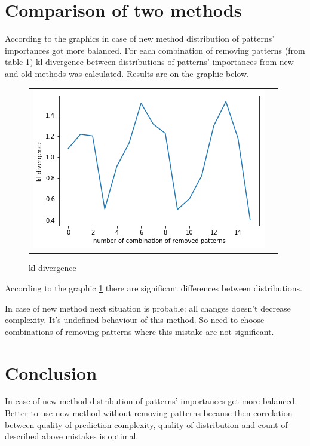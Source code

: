 \documentclass[12pt]{article}
\begin{document}
\section*{Comparison of two methods}

According to the graphics in case of 
new method distribution 
of patterns' importances got more balanced.
For each combination of removing patterns 
(from table 1) kl-divergence between
distributions of patterns' importances from
new and old methods was calculated. Results are on the graphic
below.
\begin{figure}[h!]\center
	\begin{tabular}{cc}
		\includegraphics[scale=0.5]{4.png}
	\end{tabular}
	\caption{kl-divergence}
	\label{fig:ris7}
\end{figure}
\newpage
According to the graphic \ref{fig:ris7}
there are significant differences between
distributions.

In case of new method next situation is
probable: all changes doesn't decrease 
complexity. It's undefined behaviour of
this method. So need to choose combinations of 
removing patterns where this mistake are
not significant.

\section*{Conclusion}
In case of 
new method distribution 
of patterns' importances
get more balanced.
Better to use new method
without removing patterns
because then
correlation between
quality of prediction 
complexity, quality of
distribution and count
of described above 
mistakes is optimal. 

 
\end{document}
